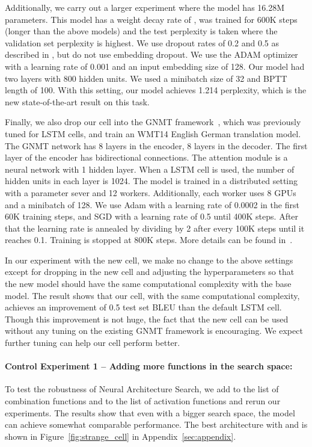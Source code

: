 \documentclass{article} \usepackage{iclr2017_conference,times}
\begin{document}
Additionally, we carry out a larger experiment where the model has 16.28M parameters. This model has a weight decay rate of , was trained for 600K steps (longer than the above models) and the test perplexity is taken where the validation set perplexity is highest. We use dropout rates of 0.2 and 0.5  as described in \cite{Gal2015}, but do not use embedding dropout. We use the ADAM optimizer with a learning rate of 0.001 and an input embedding size of 128. Our model had two layers with 800 hidden units. We used a minibatch size of 32 and BPTT length of 100. With this setting, our model achieves 1.214 perplexity, which is the new state-of-the-art result on this task.

Finally, we also drop our cell into the GNMT framework~\citep{wu2016google}, which was previously tuned for LSTM cells, and train an WMT14 English  German translation model. The GNMT network has 8 layers in the encoder, 8 layers in the decoder. The first layer of the encoder has bidirectional connections. The attention module is a neural network with 1 hidden layer. When a LSTM cell is used, the number of hidden units in each layer is 1024. The model is trained in a distributed setting with a parameter sever and 12 workers. Additionally, each worker uses 8 GPUs and a minibatch of 128. We use Adam with a learning rate of 0.0002 in the first 60K training steps, and SGD with a learning rate of 0.5 until 400K steps. After that the learning rate is annealed by dividing by 2 after every 100K steps until it reaches 0.1. Training is stopped at 800K steps. More details can be found in~\cite{wu2016google}.

In our experiment with the new cell, we make no change to the above settings except for dropping in the new cell and adjusting the hyperparameters so that the new model should have the same computational complexity with the base model. The result shows that our cell, with the same computational complexity, achieves an improvement of 0.5 test set BLEU than the default LSTM cell. Though this improvement is not huge, the fact that the new cell can be used without any tuning on the existing GNMT framework is encouraging. We expect further tuning can help our cell perform better.





\paragraph{Control Experiment 1 -- Adding more functions in the search space:} To test the robustness of Neural Architecture Search, we add  to the list of combination functions and  to the list of activation functions and rerun our experiments. The results show that even with a bigger search space, the model can achieve somewhat comparable performance. The best architecture with  and  is shown in Figure~\ref{fig:strange_cell} in Appendix~\ref{sec:appendix}. 
\end{document}

